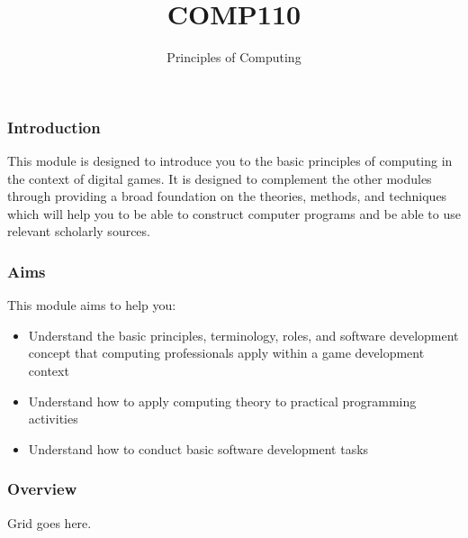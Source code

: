 \documentclass[handout, xcolor={dvipsnames}]{beamer}\usepackage{etoolbox}\newtoggle{printable}\toggletrue{printable}
\begin{document}
\title{COMP110}
\subtitle{Principles of Computing}

\frame{\titlepage} 

\begin{frame}
	\frametitle{Introduction}
	This module is designed to introduce you to the basic principles of computing in the context of digital games. It is designed to complement the other modules through providing a broad foundation on the theories, methods, and techniques which will help you to be able to construct computer programs and be able to use relevant scholarly sources.
	
\end{frame}

\begin{frame}
	\frametitle{Aims}
	
	This module aims to help you:
	
	\begin{itemize}
		\item Understand the basic principles, terminology, roles, and software development concept that computing professionals apply within a game development context 
		\item Understand how to apply computing theory to practical programming activities
		\item Understand how to conduct basic software development tasks
	\end{itemize}
\end{frame}

\begin{frame}
	\frametitle{Overview}
	
	Grid goes here.
\end{frame}
\end{document}
